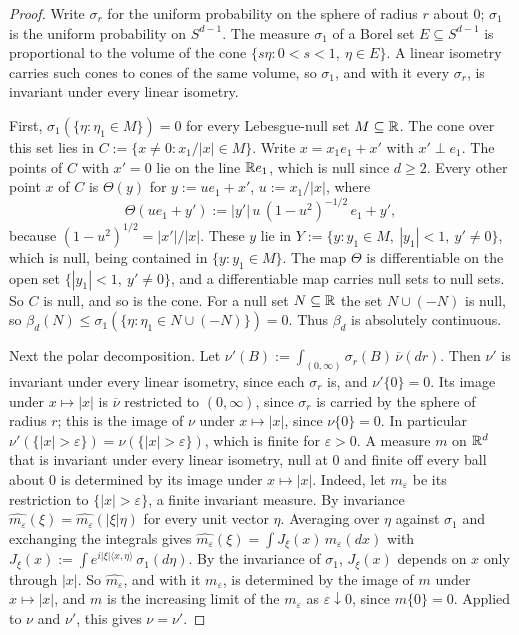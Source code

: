 \begin{proof}
Write $\sigma_r$ for the uniform probability on the sphere of radius $r$ about $0$; $\sigma_1$ is
the uniform probability on $S^{d-1}$. The measure $\sigma_1$ of a Borel set $E \subseteq S^{d-1}$ is proportional
to the volume of the cone $\{s\eta : 0 < s < 1,\ \eta \in E\}$. A linear isometry carries such cones
to cones of the same volume, so $\sigma_1$, and with it every $\sigma_r$, is invariant under every
linear isometry.

First, $\sigma_1(\{\eta : \eta_1 \in M\}) = 0$ for every Lebesgue-null set $M \subseteq \mathbb{R}$. The cone
over this set lies in $C := \{x \ne 0 : x_1/|x| \in M\}$. Write $x = x_1e_1 + x'$ with $x' \perp e_1$.
The points of $C$ with $x' = 0$ lie on the line $\mathbb{R} e_1$, which is null since $d \ge 2$. Every other
point $x$ of $C$ is $\Theta(y)$ for $y := ue_1 + x'$, $u := x_1/|x|$, where
\[
  \Theta(ue_1 + y') := |y'|\,u\,(1 - u^2)^{-1/2}\,e_1 + y' ,
\]
because $(1 - u^2)^{1/2} = |x'|/|x|$. These $y$ lie in $Y := \{y : y_1 \in M,\ |y_1| < 1,\ y' \ne 0\}$,
which is null, being contained in $\{y : y_1 \in M\}$. The map $\Theta$ is differentiable on the open
set $\{|y_1| < 1,\ y' \ne 0\}$, and a differentiable map carries null sets to null sets. So $C$ is
null, and so is the cone. For a null set $N \subseteq \mathbb{R}$ the set $N \cup (-N)$ is null, so
$\beta_d(N) \le \sigma_1(\{\eta : \eta_1 \in N \cup (-N)\}) = 0$. Thus $\beta_d$ is absolutely
continuous.

Next the polar decomposition. Let $\nu'(B) := \int_{(0,\infty)}\sigma_r(B)\,\overline\nu(dr)$. Then
$\nu'$ is invariant under every linear isometry, since each $\sigma_r$ is, and $\nu'\{0\} = 0$. Its
image under $x \mapsto |x|$ is $\overline\nu$ restricted to $(0,\infty)$, since $\sigma_r$ is carried
by the sphere of radius $r$; this is the image of $\nu$ under $x \mapsto |x|$, since $\nu\{0\} = 0$. In
particular $\nu'(\{|x| > \varepsilon\}) = \nu(\{|x| > \varepsilon\})$, which is finite for
$\varepsilon > 0$. A measure $m$ on $\mathbb{R}^d$ that is invariant under every linear isometry, null at
$0$ and finite off every ball about $0$ is determined by its image under $x \mapsto |x|$. Indeed, let
$m_\varepsilon$ be its restriction to $\{|x| > \varepsilon\}$, a finite invariant measure. By
invariance $\widehat{m_\varepsilon}(\xi) = \widehat{m_\varepsilon}(|\xi|\eta)$ for every unit vector
$\eta$. Averaging over $\eta$ against $\sigma_1$ and exchanging the integrals gives
$\widehat{m_\varepsilon}(\xi) = \int J_\xi(x)\,m_\varepsilon(dx)$ with
$J_\xi(x) := \int e^{i|\xi|\langle x, \eta\rangle}\,\sigma_1(d\eta)$. By the invariance of
$\sigma_1$, $J_\xi(x)$ depends on $x$ only through $|x|$. So $\widehat{m_\varepsilon}$, and with it
$m_\varepsilon$, is determined by the image of $m$ under $x \mapsto |x|$, and $m$ is the increasing
limit of the $m_\varepsilon$ as $\varepsilon \downarrow 0$, since $m\{0\} = 0$. Applied to $\nu$ and
$\nu'$, this gives $\nu = \nu'$.


\end{proof}
